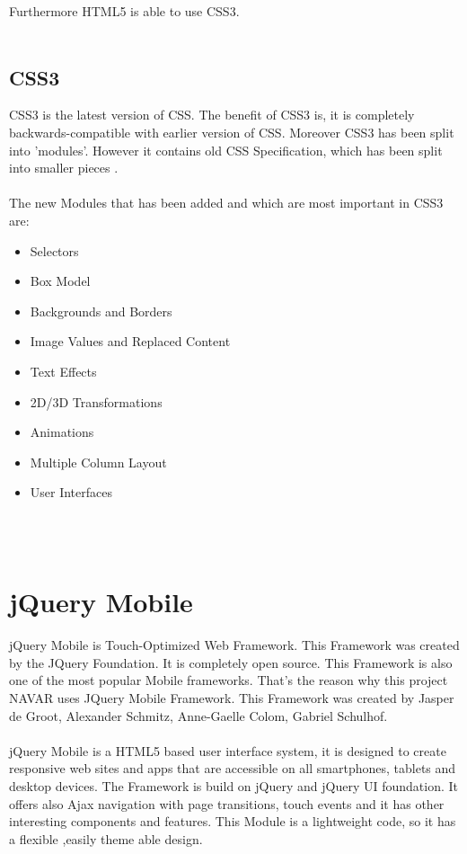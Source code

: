   Furthermore HTML5 is able to use CSS3.\cite{html5}
  \\\\
  \subsection{CSS3}
  CSS3 is the latest version of CSS. The benefit of CSS3 is, it is completely backwards-compatible with earlier version of CSS. Moreover CSS3 has been split into 'modules'. However it contains old CSS Specification, which has been split into smaller pieces .
  \\\\
  The new Modules that has been added and which are most important in CSS3 are:\\
  \begin{itemize}
  \item	Selectors
  \item	Box Model
  \item Backgrounds and Borders
  \item	Image Values and Replaced Content
  \item	Text Effects
  \item	2D/3D Transformations
  \item	Animations 
  \item 	Multiple Column Layout
  \item User Interfaces
  
  \end{itemize}
  \cite{CSS3}
  \\\\
  \section{jQuery Mobile}
  jQuery Mobile is Touch-Optimized Web Framework. This Framework was created by the JQuery Foundation. It is completely open source. This Framework is also one of the most popular Mobile frameworks. That's the  reason why this project NAVAR uses JQuery Mobile Framework. This Framework was created by Jasper de Groot, Alexander Schmitz, Anne-Gaelle Colom, Gabriel Schulhof.\\\\
  
  jQuery Mobile is a HTML5 based user interface system, it is designed to create responsive web sites and apps that are accessible on all smartphones, tablets and desktop devices. The Framework is build on jQuery and jQuery UI foundation. It offers also Ajax navigation with page transitions, touch events and it has other interesting components and features. This Module is a lightweight code, so it has a flexible ,easily theme able design. \\\\
  
